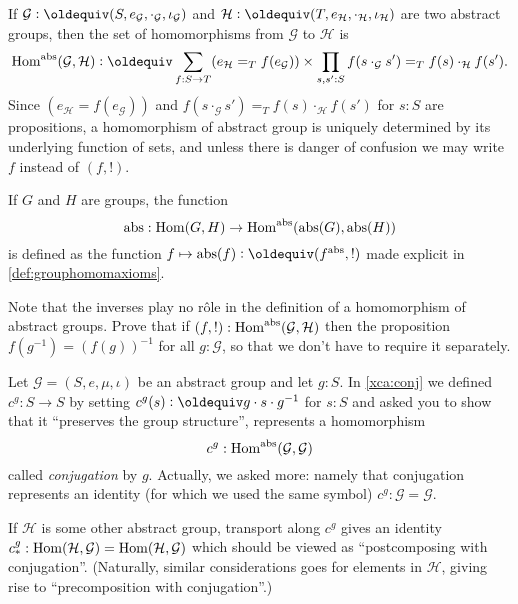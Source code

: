 \begin{definition}\label{def:abstrisfunctor}
  If $\mathcal G\defequi(S,e_{\mathcal G},\cdot_{\mathcal G},\iota_{\mathcal G})$ and $\mathcal H\defequi(T,e_{\mathcal H},\cdot_{\mathcal H},\iota_{\mathcal H})$ are two abstract groups, then the set of homomorphisms from $\mathcal G$ to $\mathcal H$ is
 $$\Hom^\abstr(\mathcal G,\mathcal H)
\defequi\sum_{f:S\to T}(e_{\mathcal H}=_Tf(e_{\mathcal G}))\times 
\prod_{s,s':S}f(s\cdot_{\mathcal G}s')=_Tf(s)\cdot_{\mathcal H}f(s').
$$
Since $(e_{\mathcal H}=f(e_{\mathcal G}))$ and
$f(s\cdot_{\mathcal G}s')=_Tf(s)\cdot_{\mathcal H}f(s')$ for $s:S$ are
propositions, a homomorphism of abstract group is uniquely determined
by its underlying function of sets, and unless there is danger of
confusion we may write $f$ instead of $(f,!)$.

If $G$ and $H$ are groups, the function
$$\mathrm{abs}:\mathrm{Hom}(G,H)\to\mathrm{Hom}^{\mathrm{abs}}(\mathrm{abs}(G),\mathrm{abs}(H))$$
is defined as the function $f\mapsto \abstr(f)\defequi(f^\abstr,!)$
made explicit in \cref{def:grouphomomaxioms}.
\end{definition}
\begin{xca}
  Note that the inverses play no r\^ole in the definition of a homomorphism of abstract groups.  Prove that if $(f,!):\mathrm{Hom}^{\mathrm{abs}}(\mathcal G,\mathcal H)$
  then the proposition $f(g^{-1})=(f(g))^{-1}$ for all $g:\mathcal
  G$, so that we don't have to require it separately.
\end{xca}
\begin{example}
  \label{ex:conjhomo}
  Let $\mathcal G=(S,e,\mu,\iota)$ be an abstract group and let $g:S$.  In \cref{xca:conj} we defined $c^g:S\to S$ by setting $c^g(s)\defequi g\cdot s\cdot g^{-1}$ for $s:S$ and asked you to show that it ``preserves the group structure'', \ie represents a homomorphism
$$c^g:\mathrm{Hom}^{\mathrm{abs}}(\mathcal G,\mathcal G)$$
called \emph{conjugation} by $g$.  
Actually, we asked more: namely that conjugation represents an identity (for which we used the same symbol) $c^g:\mathcal G=\mathcal G$.

If $\mathcal H$ is some other abstract group, transport along $c^g$ gives an identity
 $c^g_*:\mathrm{Hom}(\mathcal H,\mathcal G)=\mathrm{Hom}(\mathcal H,\mathcal G)$ which should be viewed as ``postcomposing with conjugation''.  (Naturally, similar considerations goes for elements in $\mathcal H$, giving rise to ``precomposition with conjugation''.)
\end{example}

